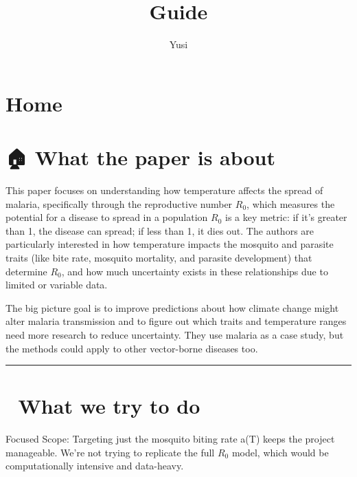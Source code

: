 \documentclass[
  letterpaper,
  DIV=11,
  numbers=noendperiod]{scrreprt}
\title{Guide}
\author{Yusi}
\date{}
\renewcommand*\contentsname{Table of contents}
\newcommand\contentsname{Table of contents}
\begin{document}
\maketitle

\renewcommand*\contentsname{Table of contents}
{
\hypersetup{linkcolor=}
\setcounter{tocdepth}{2}
\tableofcontents
}


\chapter{Home}\label{home}


\chapter{🏠 What the paper is about}\label{what-the-paper-is-about}

This paper focuses on understanding how temperature affects the spread
of malaria, specifically through the reproductive number \(R_0\), which
measures the potential for a disease to spread in a population
\(R_0\)\hspace{0pt} is a key metric: if it's greater than 1, the disease
can spread; if less than 1, it dies out. The authors are particularly
interested in how temperature impacts the mosquito and parasite traits
(like bite rate, mosquito mortality, and parasite development) that
determine \(R_0\), and how much uncertainty exists in these
relationships due to limited or variable data.

The big picture goal is to improve predictions about how climate change
might alter malaria transmission and to figure out which traits and
temperature ranges need more research to reduce uncertainty. They use
malaria as a case study, but the methods could apply to other
vector-borne diseases too.

\begin{center}\rule{0.5\linewidth}{0.5pt}\end{center}


\chapter{🧪 What we try to do}\label{what-we-try-to-do}

Focused Scope: Targeting just the mosquito biting rate a(T) keeps the
project manageable. We're not trying to replicate the full \(R_0\)
model, which would be computationally intensive and data-heavy.
\end{document}
